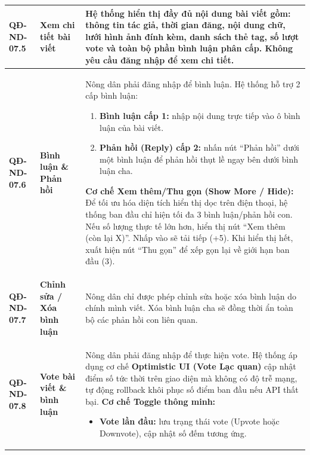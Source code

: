 \documentclass[12pt,a4paper]{article}
\begin{document}
\begin{longtable}{|
        >{\raggedright\arraybackslash}p{2.2cm}|
        >{\raggedright\arraybackslash}p{2.8cm}|
        >{\raggedright\arraybackslash}p{9.8cm}|}
    \hline
    \textbf{QĐ-ND-07.5}  & \textbf{Xem chi tiết bài viết}      &
    Hệ thống hiển thị đầy đủ nội dung bài viết gồm: thông tin tác giả, thời gian đăng, nội dung chữ, lưới hình ảnh đính kèm, danh sách thẻ tag, số lượt vote và toàn bộ phần bình luận phân cấp. Không yêu cầu đăng nhập để xem chi tiết.                                                                                                                                                       \\
    \hline
    \textbf{QĐ-ND-07.6}  & \textbf{Bình luận \& Phản hồi}      &
    Nông dân phải đăng nhập để bình luận. Hệ thống hỗ trợ 2 cấp bình luận:
    \begin{enumerate}[leftmargin=*,topsep=2pt,itemsep=1pt]
        \item \textbf{Bình luận cấp 1:} nhập nội dung trực tiếp vào ô bình luận của bài viết.
        \item \textbf{Phản hồi (Reply) cấp 2:} nhấn nút ``Phản hồi'' dưới một bình luận để phản hồi thụt lề ngay bên dưới bình luận cha.
    \end{enumerate}
    \textbf{Cơ chế Xem thêm/Thu gọn (Show More / Hide):} Để tối ưu hóa diện tích hiển thị dọc trên điện thoại, hệ thống ban đầu chỉ hiện tối đa 3 bình luận/phản hồi con. Nếu số lượng thực tế lớn hơn, hiển thị nút ``Xem thêm (còn lại X)''. Nhấp vào sẽ tải tiếp (+5). Khi hiển thị hết, xuất hiện nút ``Thu gọn'' để xếp gọn lại về giới hạn ban đầu (3).                                   \\
    \hline
    \textbf{QĐ-ND-07.7}  & \textbf{Chỉnh sửa / Xóa bình luận}  &
    Nông dân chỉ được phép chỉnh sửa hoặc xóa bình luận do chính mình viết. Xóa bình luận cha sẽ đồng thời ẩn toàn bộ các phản hồi con liên quan.                                                                                                                                                                                                                                               \\
    \hline
    \textbf{QĐ-ND-07.8}  & \textbf{Vote bài viết \& bình luận} &
    Nông dân phải đăng nhập để thực hiện vote. Hệ thống áp dụng cơ chế \textbf{Optimistic UI (Vote Lạc quan)} cập nhật điểm số tức thời trên giao diện mà không có độ trễ mạng, tự động rollback khôi phục số điểm ban đầu nếu API thất bại.
    \textbf{Cơ chế Toggle thông minh:}
    \begin{itemize}[leftmargin=*,topsep=2pt,itemsep=1pt]
        \item \textbf{Vote lần đầu:} lưu trạng thái vote (Upvote hoặc Downvote), cập nhật số đếm tương ứng.

\end{itemize}
\end{longtable}
\end{document}
